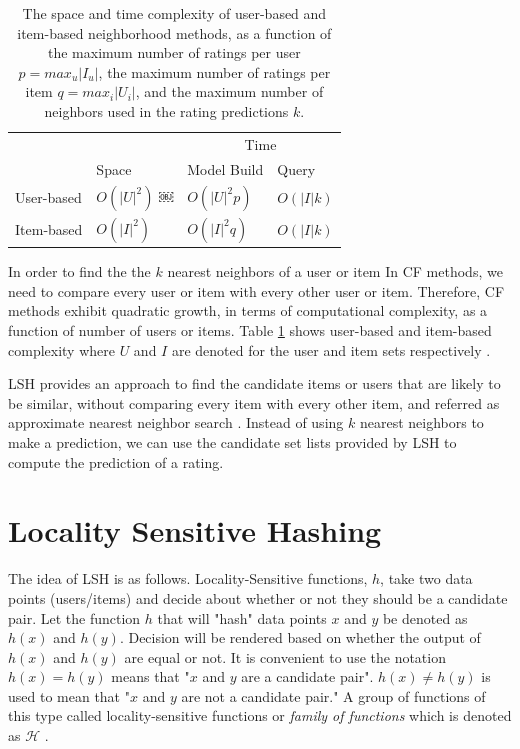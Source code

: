 \documentclass[conference]{IEEEtran}
\begin{document}
\begin{table}
\centering
\begin{tabular}{llll}
\hline
& & \multicolumn {2}{c}{Time} \\
\cline{3-4}
     & Space & Model Build  & Query \\
\hline
User-based & $O(|U|^2)$ ￼& $O(|U|^2 p)$ &$O(|I|k)$ \\
Item-based & $O(|I|^2)$ & $O(|I|^2q)$ & $O(|I|k)$   \\
\hline
\end{tabular}
\caption{The space and time complexity of user-based and item-based 
neighborhood methods, as a function of the maximum number of ratings per user
$p = max_{u}|I_{u}|$, the maximum number of ratings per item 
$q = max_{i}|U_{i}|$, and the maximum number of neighbors used in the rating
predictions $k$.}
\label{table:complexity}
\end{table}
In order to find the the $k$ nearest neighbors of a user or item In CF methods, 
we need to compare every user or item with every other user or item. 
Therefore, CF methods exhibit quadratic growth,  in terms of computational 
complexity,  as a function of number of users or items. Table \ref{table:complexity} 
shows user-based and item-based complexity where $U$ and $I$ are denoted for 
the user and item sets respectively \cite{DBLP:reference/rsh/DesrosiersK11}.

LSH provides an approach to find the candidate items or users that are likely 
to be similar, without comparing every item with every other item, and referred
as approximate nearest neighbor search \cite{Rajaraman:2011:MMD:2124405}. 
Instead of using $k$ nearest neighbors to make a prediction, we can use the candidate 
set lists provided by LSH to compute the prediction of a rating. 


\section{Locality Sensitive Hashing}
\label{sec:lsh}

The idea of LSH is as follows. Locality-Sensitive functions, $h$, take two data
points (users/items) and decide about whether or not they should be a candidate
pair. Let the function $h$ that will "hash" data points $x$ and $y$ be denoted 
as $h(x)$ and $h(y)$. Decision will be rendered based on whether the output of
$h(x)$ and $h(y)$ are equal or not. It is convenient to use the notation 
$h(x) = h(y)$ means that "$x$ and $y$ are a candidate pair". $h(x) \neq h(y)$ 
is used to mean that "$x$ and $y$ are not a candidate pair." A group of functions 
of this type called locality-sensitive functions or \textit{family of functions}
which is denoted as $\mathcal{H}$ \cite[p.~86]{Rajaraman:2011:MMD:2124405}.
\end{document}
